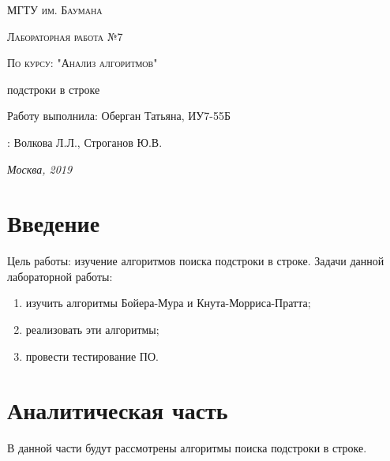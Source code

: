 \documentclass[12pt]{report}
\begin{document}
\begin{titlepage}
	\centering
	{\scshape\LARGE МГТУ им. Баумана \par}
	\vspace{3cm}
	{\scshape\Large Лабораторная работа №7\par}
	\vspace{0.5cm}	
	{\scshape\Large По курсу: "Анализ алгоритмов"\par}
	\vspace{1.5cm}
	{\huge{} подстроки в строке\par}
	\vspace{2cm}
	\Large Работу выполнила: Оберган Татьяна, ИУ7-55Б\par
	\vspace{0.5cm}
	:  Волкова Л.Л., Строганов Ю.В.\par

	\vfill
	\large \textit {Москва, 2019} \par
\end{titlepage}

\tableofcontents

\newpage
\chapter*{Введение}
Цель работы: изучение алгоритмов поиска подстроки в строке.
\newline
Задачи данной лабораторной работы:
\begin{enumerate}
        \item изучить алгоритмы Бойера-Мура и Кнута-Морриса-Пратта;
        \item реализовать эти алгоритмы;
        \item провести тестирование ПО.
\end{enumerate}



\chapter{Аналитическая часть}
В данной части будут рассмотрены алгоритмы поиска подстроки в строке.
\end{document}
